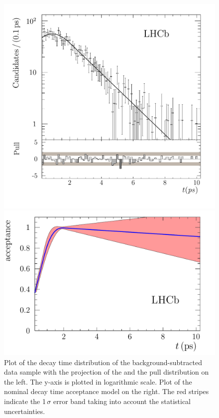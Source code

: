 \begin{figure}[!htb]
\hspace*{\fill}
\begin{minipage}{0.4\textwidth}
\includegraphics[width=\textwidth]{07-B02DD/tikz/pdf/obsTime_summed_pull_logy.pdf}
\end{minipage}
\hfill
\begin{minipage}{0.4\textwidth}
\includegraphics[width=\textwidth]{07-B02DD/tikz/pdf/Acceptancespline_nolog.pdf}
\end{minipage}
\hspace*{\fill}
\caption{Plot of the decay time distribution of the background-subtracted \BdToDD
data sample with the projection of the \PDF and the pull distribution on the
left. The y-axis is plotted in logarithmic scale. Plot of the nominal decay
time acceptance model on the right. The red stripes indicate the 1\,$\sigma$
error band taking into account the statistical uncertainties.}
\label{fig:b02dd:decaytimefit}
\end{figure}

